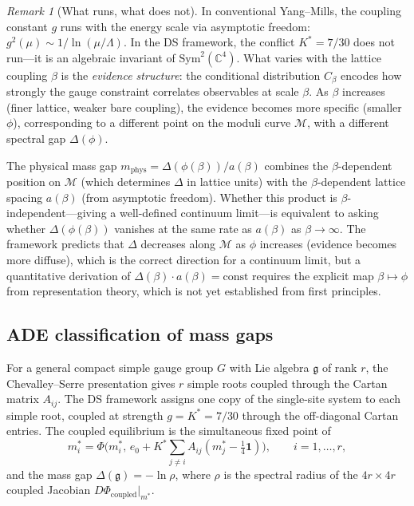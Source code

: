 \documentclass[11pt,a4paper]{article}
\theoremstyle{definition}
\theoremstyle{remark}
\newtheorem{remark}[theorem]{Remark}
\newcommand{\C}{\mathbb{C}}
\begin{document}
\begin{remark}[What runs, what does not]\label{rem:running}
In conventional Yang--Mills, the coupling constant $g$ runs with the energy scale via asymptotic freedom: $g^2(\mu)\sim 1/\ln(\mu/\Lambda)$. In the DS framework, the conflict $K^*=7/30$ does not run---it is an algebraic invariant of $\mathrm{Sym}^2(\C^4)$. What varies with the lattice coupling $\beta$ is the \emph{evidence structure}: the conditional distribution $C_\beta$ encodes how strongly the gauge constraint correlates observables at scale $\beta$. As $\beta$ increases (finer lattice, weaker bare coupling), the evidence becomes more specific (smaller $\phi$), corresponding to a different point on the moduli curve $\mathcal{M}$, with a different spectral gap $\Delta(\phi)$.

The physical mass gap $m_{\mathrm{phys}}=\Delta(\phi(\beta))/a(\beta)$ combines the $\beta$-dependent position on $\mathcal{M}$ (which determines $\Delta$ in lattice units) with the $\beta$-dependent lattice spacing $a(\beta)$ (from asymptotic freedom). Whether this product is $\beta$-independent---giving a well-defined continuum limit---is equivalent to asking whether $\Delta(\phi(\beta))$ vanishes at the same rate as $a(\beta)$ as $\beta\to\infty$. The framework predicts that $\Delta$ decreases along $\mathcal{M}$ as $\phi$ increases (evidence becomes more diffuse), which is the correct direction for a continuum limit, but a quantitative derivation of $\Delta(\beta)\cdot a(\beta)=\mathrm{const}$ requires the explicit map $\beta\mapsto\phi$ from representation theory, which is not yet established from first principles.
\end{remark}

\subsection{ADE classification of mass gaps}\label{sec:ade}

For a general compact simple gauge group $G$ with Lie algebra $\mathfrak{g}$ of rank $r$, the Chevalley--Serre presentation gives $r$ simple roots coupled through the Cartan matrix $A_{ij}$. The DS framework assigns one copy of the single-site system to each simple root, coupled at strength $g=K^*=7/30$ through the off-diagonal Cartan entries. The coupled equilibrium is the simultaneous fixed point of
\[
m_i^* = \Phi\bigl(m_i^*,\, e_0 + K^*\!\textstyle\sum_{j\neq i} A_{ij}(m_j^*-\tfrac{1}{4}\mathbf{1})\bigr), \qquad i=1,\ldots,r,
\]
and the mass gap $\Delta(\mathfrak{g})=-\ln\rho$, where $\rho$ is the spectral radius of the $4r\times 4r$ coupled Jacobian $D\Phi_{\mathrm{coupled}}|_{m^*}$.
\end{document}
